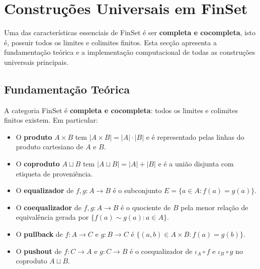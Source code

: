 %

\section{Construções Universais em FinSet}

Uma das características essenciais de FinSet é ser
\textbf{completa e cocompleta}, isto é, possuir todos os limites
e colimites finitos. Esta secção apresenta a fundamentação
teórica e a implementação computacional de todas as construções
universais principais.

\subsection{Fundamentação Teórica}

\begin{proposition}
	A categoria FinSet é \textbf{completa e cocompleta}: todos os
	limites e colimites finitos existem. Em particular:
	\begin{itemize}
		\item O \textbf{produto} $A \times B$ tem
		$|A \times B| = |A| \cdot |B|$ e é representado
		pelas linhas do produto cartesiano de $A$ e $B$.
		\item O \textbf{coproduto} $A \sqcup B$ tem
		$|A \sqcup B| = |A| + |B|$ e é a união disjunta
		com etiqueta de proveniência.
		\item O \textbf{equalizador} de $f, g: A \to B$ é o
		subconjunto $E = \{a \in A : f(a) = g(a)\}$.
		\item O \textbf{coequalizador} de $f, g: A \to B$ é o
		quociente de $B$ pela menor relação de equivalência
		gerada por $\{f(a) \sim g(a) : a \in A\}$.
		\item O \textbf{pullback} de $f: A \to C$ e $g: B \to C$
		é $\{(a,b) \in A \times B : f(a) = g(b)\}$.
		\item O \textbf{pushout} de $f: C \to A$ e $g: C \to B$
		é o coequalizador de $\iota_A \circ f$ e
		$\iota_B \circ g$ no coproduto $A \sqcup B$.
	\end{itemize}
\end{proposition}

